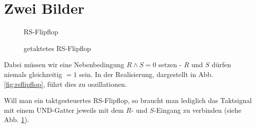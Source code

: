 \section{Zwei Bilder}

\begin{figure}[h!]
	\centering
	\centering
	\caption{RS-Flipflop}%
	\label{fig:rsflipflop}
	\endminipage\hspace{1cm}   
	\centering
	\caption{getaktetes RS-Flipflop}%
	\label{fig:rsflipfloptakt}
	\endminipage
\end{figure}

Dabei müssen wir eine Nebenbedingung $R \wedge S = 0$ setzen - $R$ und $S$ dürfen niemals gleichzeitig $= 1$ sein. In der Realisierung, dargestellt in Abb. \ref{fig:rsflipflop}, führt dies zu oszillationen. 

Will man ein taktgesteuertes RS-Flipflop, so braucht man lediglich das Taktsignal mit einem UND-Gatter jeweils mit dem $R$- und $S$-Eingang zu verbinden (siehe Abb. \ref{fig:rsflipfloptakt}).



